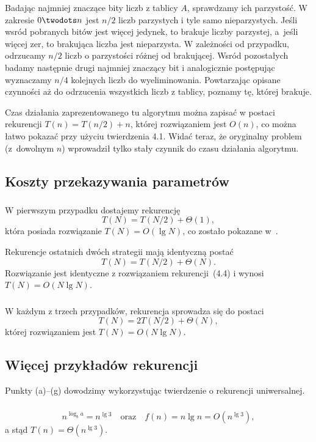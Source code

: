 Badając najmniej znaczące bity liczb z tablicy $A$, sprawdzamy ich parzystość. W zakresie $0\twodots n$ jest $n/2$ liczb parzystych i tyle samo nieparzystych. Jeśli wsród pobranych bitów jest więcej jedynek, to brakuje liczby parzystej, a~jeśli więcej zer, to brakująca liczba jest nieparzysta. W zależności od przypadku, odrzucamy $n/2$ liczb o parzystości różnej od brakującej. Wsród pozostałych badamy następnie drugi najmniej znaczący bit i analogicznie postępując wyznaczamy $n/4$ kolejnych liczb do wyeliminowania. Powtarzając opisane czynności aż do odrzucenia wszystkich liczb z tablicy, poznamy tę, której brakuje.

Czas działania zaprezentowanego tu algorytmu można zapisać w postaci rekurencji $T(n)=T(n/2)+n$, której rozwiązaniem jest $O(n)$, co można łatwo pokazać przy użyciu twierdzenia 4.1. Widać teraz, że oryginalny problem (z~dowolnym $n$) wprowadził tylko stały czynnik do czasu działania algorytmu.

\subsection{Koszty przekazywania parametrów} %

\subsubsection{} %
W pierwszym przypadku dostajemy rekurencję
\[
	T(N) = T(N/2)+\Theta(1),
\]
która posiada rozwiązanie $T(N)=O(\lg N)$, co zostało pokazane w~.

\medskip
\noindent Rekurencje ostatnich dwóch strategii mają identyczną postać
\[
	T(N) = T(N/2)+\Theta(N).
\]
Rozwiązanie jest identyczne z rozwiązaniem rekurencji~(4.4) i wynosi $T(N)=O(N\lg N)$.

\subsubsection{} %
W każdym z trzech przypadków, rekurencja sprowadza się do postaci
\[
	T(N) = 2T(N/2)+\Theta(N),
\]
której rozwiązaniem jest $T(N)=O(N\lg N)$.

\subsection{Więcej przykładów rekurencji} %
Punkty (a)\nobreakdash--(g) dowodzimy wykorzystując twierdzenie o rekurencji uniwersalnej.

\subsubsection{} %
\[
	n^{\log_ba} = n^{\lg3} \quad\text{oraz}\quad f(n) = n\lg n = O(n^{\lg3}),
\]
a stąd $T(n)=\Theta(n^{\lg3})$.

